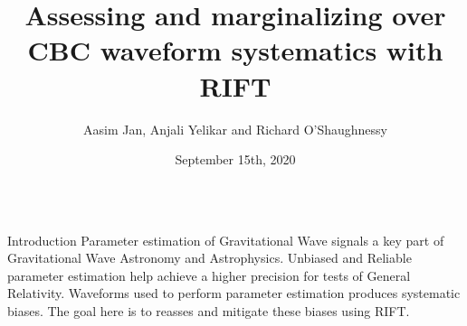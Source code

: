 \documentclass[serif]{beamer}
\title{
%
  Assessing and marginalizing over CBC waveform systematics with RIFT
%
}
\author{
%
Aasim Jan, Anjali Yelikar and Richard O'Shaughnessy                      %
%
}
\institute{}
\date{September 15th, 2020}
\begin{document}
\begin{frame}{}

\begin{columns}

\begin{column}[T]{.3\textwidth}

\begin{block}{Introduction}
  Parameter estimation of Gravitational Wave signals a key part of Gravitational Wave Astronomy and Astrophysics. Unbiased and Reliable parameter estimation help achieve a higher precision for tests of General Relativity. Waveforms used to perform parameter estimation produces systematic biases. The goal here is to reasses and mitigate these biases using RIFT.







\end{block}

\vspace{1em}


\end{column}
\end{columns}
\end{frame}
\end{document}
